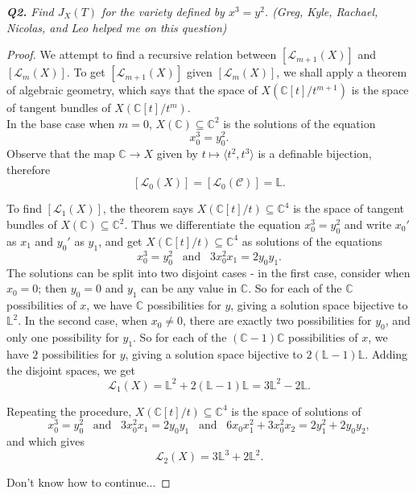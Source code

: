 \documentclass{article}
\begin{document}
\it \textbf{Q2.} Find $J_X(T)$ for the variety defined by $x^3=y^2$. (Greg,
Kyle, Rachael, Nicolas, and Leo helped me on this question)
\begin{proof}
  We attempt to find a recursive relation between $[\mathcal{L}_{m+1}(X)]$
  and $[\mathcal{L}_{m}(X)]$. To get $[\mathcal{L}_{m+1}(X)]$ given
  $[\mathcal{L}_{m}(X)]$, we shall apply a theorem of algebraic geometry,
  which says that the space of $X(\mathbb{C}[t]/t^{m+1})$ is the space of
  tangent bundles of $X(\mathbb{C}[t]/t^{m})$. \\

  In the base case when $m=0$, $X(\mathbb{C}) \subseteq\mathbb{C}^2$
  is the solutions of the equation
  \[x_0^3=y_0^2.\]
  Observe that the map $\mathbb{C}\rightarrow X$ given by $t\mapsto\langle
  t^2,t^3\rangle$ is a definable bijection, therefore
  \[[\mathcal{L}_0(X)] =[\mathcal{L}_0(\mathcal{C})] =\mathbb{L}.\]

  To find $[\mathcal{L}_{1}(X)]$, the theorem says $X(\mathbb{C}[t]/t)
  \subseteq\mathbb{C}^4$ is the space of tangent bundles of
  $X(\mathbb{C})\subseteq\mathbb{C}^2$. Thus we differentiate the
  equation $x_0^3=y_0^2$ and write $x_0'$ as $x_1$ and $y_0'$ as $y_1$, and
  get $X(\mathbb{C}[t]/t) \subseteq\mathbb{C}^4$ as solutions of the
  equations
  \[x_0^3=y_0^2\;\;\; \text{and}\;\;\; 3x_0^2x_1=2y_0y_1.\]
  The solutions can be split into two disjoint cases - in the first case,
  consider when $x_0=0$; then $y_0=0$ and $y_1$ can be any value in
  $\mathbb{C}$. So for each of the $\mathbb{C}$ possibilities of $x$, we
  have $\mathbb{C}$ possibilities for $y$, giving a solution space
  bijective to $\mathbb{L}^2$. In the second case, when $x_0\neq0$, there
  are exactly two possibilities for $y_0$, and only one possibility for
  $y_1$. So for each of the $(\mathbb{C}-1)\mathbb{C}$ possibilities of
  $x$, we have $2$ possibilities for $y$, giving a solution space bijective
  to $2(\mathbb{L}-1)\mathbb{L}$. Adding the disjoint spaces, we get
  \[\mathcal{L}_1(X) =\mathbb{L}^2 +2(\mathbb{L}-1)\mathbb{L}
  =3\mathbb{L}^2-2\mathbb{L}.\]

  Repeating the procedure, $X(\mathbb{C}[t]/t) \subseteq\mathbb{C}^4$ is
  the space of solutions of
  \[x_0^3=y_0^2\;\;\; \text{and}\;\;\; 3x_0^2x_1=2y_0y_1\;\;\;
  \text{and}\;\;\; 6x_0x_1^2+3x_0^2x_2=2y_1^2+2y_0y_2,\]
  and which gives 
  \[\mathcal{L}_2(X) =3\mathbb{L}^3 +2\mathbb{L}^2.\]

  Don't know how to continue...
\end{proof}
\end{document}
